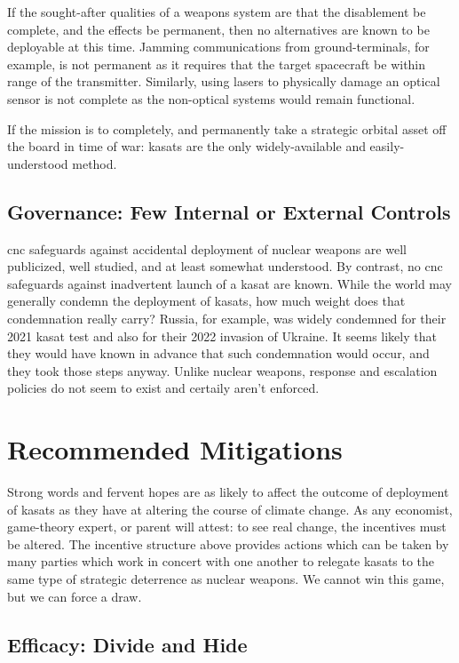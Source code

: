 If the sought-after qualities of a weapons system are that the
disablement be complete, and the effects be permanent, then no
alternatives are known to be deployable at this time.  Jamming
communications from ground-terminals, for example, is not permanent as
it requires that the target spacecraft be within range of the
transmitter.  Similarly, using \acp{laser} to physically damage an
optical sensor is not complete as the non-optical systems would remain
functional.

If the mission is to completely, and permanently take a strategic
orbital asset off the board in time of war: \acp{kasat} are the only
widely-available and easily-understood method.


\subsection*{Governance: Few Internal or External Controls}

\ac{cnc} safeguards against accidental deployment of nuclear weapons
are well publicized, well studied, and at least somewhat understood.
By contrast, no \ac{cnc} safeguards against inadvertent launch of a
\ac{kasat} are known.  While the world may generally condemn the
deployment of \acp{kasat}, how much weight does that condemnation
really carry?  Russia, for example, was widely condemned for their
2021 \ac{kasat} test and also for their 2022 invasion of Ukraine.  It
seems likely that they would have known in advance that such
condemnation would occur, and they took those steps anyway.  Unlike
nuclear weapons, response and escalation policies do not seem to
exist and certaily aren't enforced.


\section*{Recommended Mitigations}

Strong words and fervent hopes are as likely to affect the outcome of
deployment of \acp{kasat} as they have at altering the course of
climate change.  As any economist, game-theory expert, or parent will
attest: to see real change, the incentives must be altered.  The
incentive structure above provides actions which can be taken by many
parties which work in concert with one another to relegate \acp{kasat}
to the same type of strategic deterrence as nuclear weapons.  We
cannot win this game, but we can force a draw.


\subsection*{Efficacy: Divide and Hide}

